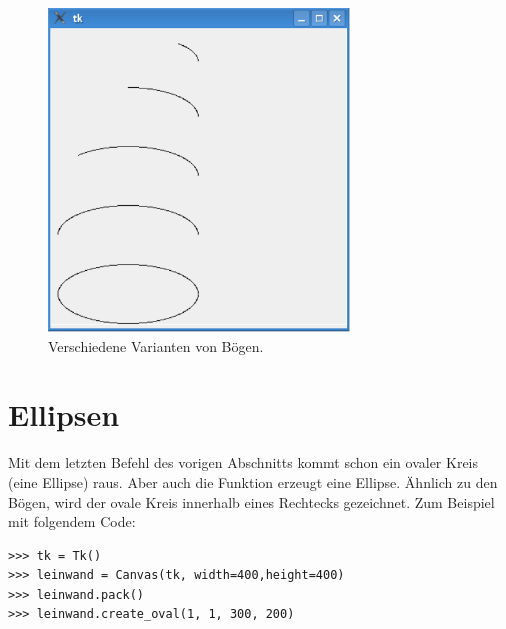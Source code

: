 \begin{figure}
\begin{center}
\includegraphics[width=80mm]{images/figure37}
\end{center}
\caption{Verschiedene Varianten von Bögen.}\label{fig37}
\end{figure}

\section{Ellipsen}

Mit dem letzten Befehl des vorigen Abschnitts kommt schon ein ovaler Kreis (eine Ellipse) raus. Aber auch die Funktion  erzeugt eine Ellipse. Ähnlich zu den Bögen, wird der ovale Kreis innerhalb eines Rechtecks gezeichnet. Zum Beispiel mit folgendem Code:

\begin{Verbatim}[frame=single]
>>> tk = Tk()
>>> leinwand = Canvas(tk, width=400,height=400)
>>> leinwand.pack()
>>> leinwand.create_oval(1, 1, 300, 200)
\end{Verbatim}

